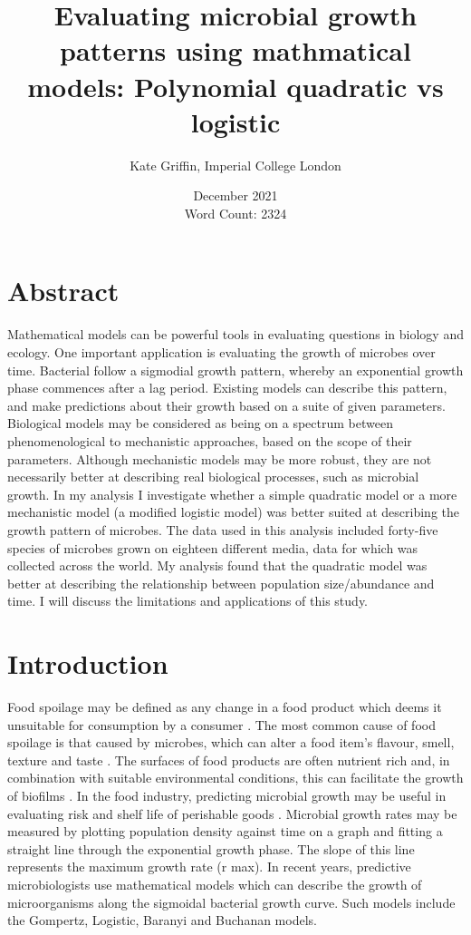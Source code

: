 \documentclass{article}[11pt]
\title{Evaluating microbial growth patterns using mathmatical models: Polynomial quadratic vs logistic}
\author{Kate Griffin, Imperial College London}
\date{December 2021\\Word Count: 2324}
\begin{document}
\maketitle
\newpage
\tableofcontents
\newpage
\begin{flushleft}
	
\section{Abstract}
Mathematical models can be powerful tools in evaluating questions in biology and ecology. One important application is evaluating the growth of microbes over time. Bacterial follow a sigmodial growth pattern, whereby an exponential growth phase commences after a lag period. Existing models can describe this pattern, and make predictions about their growth based on a suite of given parameters. Biological models may be considered as being on a spectrum between phenomenological to mechanistic approaches, based on the scope of their parameters. Although mechanistic models may be more robust, they are not necessarily better at describing real biological processes, such as microbial growth. In my analysis I investigate whether a simple quadratic model or a more mechanistic model (a modified logistic model) was better suited at describing the growth pattern of microbes. The data used in this analysis included forty-five species of microbes grown on eighteen different media, data for which was collected across the world. My analysis found that the quadratic model was better at describing the relationship between population size/abundance and time. I will discuss the limitations and applications of this study. 


\newpage
\section{Introduction}

Food spoilage may be defined as any change in a food product which deems it unsuitable for consumption by a consumer \cite{bae2014growth}. The most common cause of food spoilage is that caused by microbes, which can alter a food item’s flavour, smell, texture and taste \cite{bae2014growth}. The surfaces of food products are often nutrient rich and, in combination with suitable environmental conditions, this can facilitate the growth of biofilms \cite{bae2014growth}. In the food industry, predicting microbial growth may be useful in evaluating risk and shelf life of perishable goods \cite{huang2013optimization}\cite{bae2014growth}\cite{zwietering1990modeling}. Microbial growth rates may be measured by plotting population density against time on a graph and fitting a straight line through the exponential growth phase. The slope of this line represents the maximum growth rate (r max). In recent years, predictive microbiologists use mathematical models which can describe the growth of microorganisms along the sigmoidal bacterial growth curve. Such models include the Gompertz, Logistic, Baranyi and Buchanan models\cite{huang2013optimization}.
\linebreak


\end{flushleft}
\end{document}
